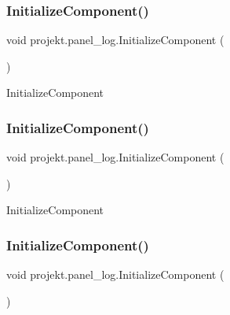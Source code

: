 \subsubsection{\texorpdfstring{Initialize\+Component()}{InitializeComponent()}\hspace{0.1cm}{\footnotesize\ttfamily [4/9]}}
{\footnotesize\ttfamily void projekt.\+panel\+\_\+log.\+Initialize\+Component (\begin{DoxyParamCaption}{ }\end{DoxyParamCaption})\hspace{0.3cm}{\ttfamily [inline]}}



Initialize\+Component 

\mbox{\label{classprojekt_1_1panel__log_a4e106ef7dc0b75cb61bb7018dff7e746}} 
\subsubsection{\texorpdfstring{Initialize\+Component()}{InitializeComponent()}\hspace{0.1cm}{\footnotesize\ttfamily [5/9]}}
{\footnotesize\ttfamily void projekt.\+panel\+\_\+log.\+Initialize\+Component (\begin{DoxyParamCaption}{ }\end{DoxyParamCaption})\hspace{0.3cm}{\ttfamily [inline]}}



Initialize\+Component 

\mbox{\label{classprojekt_1_1panel__log_a4e106ef7dc0b75cb61bb7018dff7e746}} 
\subsubsection{\texorpdfstring{Initialize\+Component()}{InitializeComponent()}\hspace{0.1cm}{\footnotesize\ttfamily [6/9]}}
{\footnotesize\ttfamily void projekt.\+panel\+\_\+log.\+Initialize\+Component (\begin{DoxyParamCaption}{ }\end{DoxyParamCaption})\hspace{0.3cm}{\ttfamily [inline]}}



